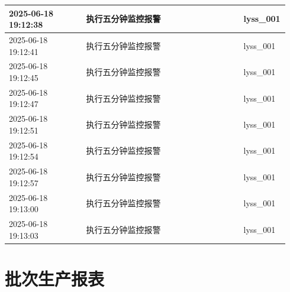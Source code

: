 \documentclass[UTF8,10pt,a4paper,fontset=fandol]{ctexart}
\begin{document}
\begin{center}
\begin{tabular}{|p{0.27\linewidth}|p{0.55\linewidth}|p{0.12\linewidth}|}
\hline
2025-06-18 19:12:38 & 执行五分钟监控报警 & lyss\_001\\
\hline
2025-06-18 19:12:41 & 执行五分钟监控报警 & lyss\_001\\
\hline
2025-06-18 19:12:45 & 执行五分钟监控报警 & lyss\_001\\
\hline
2025-06-18 19:12:47 & 执行五分钟监控报警 & lyss\_001\\
\hline
2025-06-18 19:12:51 & 执行五分钟监控报警 & lyss\_001\\
\hline
2025-06-18 19:12:54 & 执行五分钟监控报警 & lyss\_001\\
\hline
2025-06-18 19:12:57 & 执行五分钟监控报警 & lyss\_001\\
\hline
2025-06-18 19:13:00 & 执行五分钟监控报警 & lyss\_001\\
\hline
2025-06-18 19:13:03 & 执行五分钟监控报警 & lyss\_001\\
\hline
\end{tabular}
\end{center}


\newpage

\section*{批次生产报表}
\end{document}

